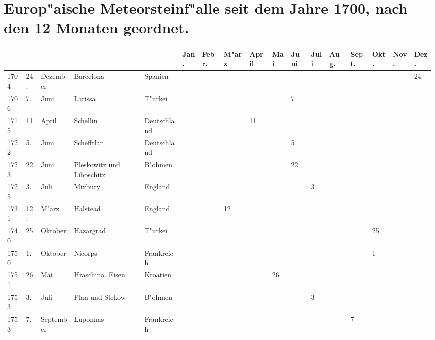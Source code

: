 \documentclass[a4paper, 8pt, oneside, polutonikogreek, german]{article}
\begin{document}
\section{Europ"aische Meteorsteinf"alle seit dem Jahre 1700, nach den 12 Monaten geordnet.}
\vspace*{\fill}
\clearpage
\begin{landscape}
\begin{table}[H]
    \footnotesize
    \centering
    \begin{longtable}{|p{5mm}|p{4mm}|p{13mm}|p{17mm}|p{17mm}|p{4mm}|p{6mm}|p{6mm}|p{6mm}|p{4mm}|p{5mm}|p{4mm}|p{5mm}|p{6mm}|p{5mm}|p{5mm}|p{5mm}|}
    \hline
         &  &  &  &  & Jan. & Febr. & M"arz & April & Mai & Juni & Juli & Aug. & Sept. & Okt. & Nov. & Dez. \\ \hline
        1704 & 24. & Dezember & Barcelona & Spanien & ~ & ~ & ~ & ~ & ~ & ~ & ~ & ~ & ~ & ~ & ~ & 24 \\ \hline
        1706 & 7. & Juni & Larissa & T"urkei & ~ & ~ & ~ & ~ & ~ & 7 & ~ & ~ & ~ & ~ & ~ & ~ \\ \hline
        1715 & 11. & April & Schellin & Deutschland & ~ & ~ & ~ & 11 & ~ & ~ & ~ & ~ & ~ & ~ & ~ & ~ \\ \hline
        1722 & 5. & Juni & Schefftlar & Deutschland & ~ & ~ & ~ & ~ & ~ & 5 & ~ & ~ & ~ & ~ & ~ & ~ \\ \hline
        1723 & 22. & Juni & Pleskowitz und Liboschitz & B"ohmen & ~ & ~ & ~ & ~ & ~ & 22 & ~ & ~ & ~ & ~ & ~ & ~ \\ \hline
        1725 & 3. & Juli & Mixbury & England & ~ & ~ & ~ & ~ & ~ & ~ & 3 & ~ & ~ & ~ & ~ & ~ \\ \hline
        1731 & 12. & M"arz & Halstead & England & ~ & ~ & 12 & ~ & ~ & ~ & ~ & ~ & ~ & ~ & ~ & ~ \\ \hline
        1740 & 25. & Oktober & Hazargrad & T"urkei & ~ & ~ & ~ & ~ & ~ & ~ & ~ & ~ & ~ & 25 & ~ & ~ \\ \hline
        1750 & 1. & Oktober & Nicorps & Frankreich & ~ & ~ & ~ & ~ & ~ & ~ & ~ & ~ & ~ & 1 & ~ & ~ \\ \hline
        1751 & 26. & Mai & Hraschina. Eisen. & Kroatien & ~ & ~ & ~ & ~ & 26 & ~ & ~ & ~ & ~ & ~ & ~ & ~ \\ \hline
        1753 & 3. & Juli & Plan und Strkow & B"ohmen & ~ & ~ & ~ & ~ & ~ & ~ & 3 & ~ & ~ & ~ & ~ & ~ \\ \hline
        1753 & 7. & September & Luponnas & Frankreich & ~ & ~ & ~ & ~ & ~ & ~ & ~ & ~ & 7 & ~ & ~ & ~ \\ \hline

\end{longtable}
\end{table}
\end{landscape}
\end{document}
